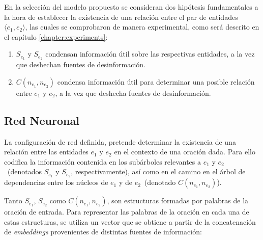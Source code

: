 En la selección del modelo propuesto se consideran dos hipótesis fundamentales a la hora de establecer la existencia de una relación entre el par de entidades $\langle e_1,e_2 \rangle$, las cuales se comprobaron de manera experimental, como será descrito en el capítulo \ref{chapter:experiments}:

\begin{enumerate}
	\item $S_{e_1}$ y $S_{e_2}$ condensan información útil sobre las respectivas entidades, a la vez que deshechan fuentes de desinformación.
	
	\item $C(n_{e_1}, n_{e_2})$ condensa información útil para determinar una posible relación entre $e_1$ y $e_2$, a la vez que deshecha fuentes de desinformación.
\end{enumerate}


\subsection{Red Neuronal}

La configuración de red definida, pretende determinar la existencia de una relación entre las entidades $e_1$ y $e_2$ en el contexto de una oración dada. Para ello codifica la información contenida en los subárboles relevantes a $e_1$ y $e_2$~(denotados $S_{e_1}$ y $S_{e_2}$, respectivamente), así como en el camino en el árbol de dependencias entre los núcleos de $e_1$ y de $e_2$~(denotado $C(n_{e_1}, n_{e_2})$).

Tanto $S_{e_1}$, $S_{e_2}$ como $C(n_{e_1}, n_{e_2})$, son estructuras formadas por palabras de la oración de entrada. Para representar las palabras de la oración en cada una de estas estructuras, se utiliza un vector que se obtiene a partir de la concatenación de \textit{embeddings} provenientes de distintas fuentes de información:

